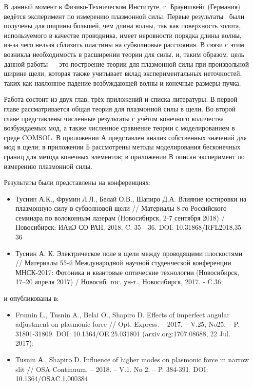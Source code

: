 В данный момент в Физико-Техническом Институте, г. Брауншвейг (Германия) ведётся эксперимент по измерению плазмонной силы. Первые результаты~\cite{nies2018direct} были получены для ширины большей, чем длина волны, так как поверхность золота, используемого в качестве проводника, имеет неровности порядка длины волны, из-за чего нельзя сблизить пластины на субволновые расстояния. В связи с этим возникла необходимость в расширении теории для силы, и, таким образом, цель данной работы --- это построение теории для плазмонной силы при произвольной ширине щели, которая также учитывает вклад экспериментальных неточностей, таких как наклонное падение возбуждающей волны и конечные размеры пучка. 

Работа состоит из двух глав, трёх приложений и списка литературы.
В первой главе рассматривается общая теория для плазмонной силы в щели. Во второй главе представлены численные результаты с учётом конечного количества возбуждаемых мод, а также численное сравнение теории с моделированием в среде COMSOL. В приложении А представлен анализ собственных значений для мод в щели; в приложении Б рассмотрены методы моделирования бесконечных границ для метода конечных элементов; в приложении В описан эксперимент по измерению плазмонной силы.

Результаты были представлены на конференциях:
\begin{itemize} 
    \item Туснин А.К., Фрумин Л.Л., Белай О.В., Шапиро Д.А. Влияние
юстировки на плазмонную силу в субволновой щели // Материалы 8-го Российского семинара по волоконным лазерам (Новосибирск, 2-7 сентября 2018) / Новосибирск: ИАиЭ СО РАН, 2018,
C. 35—36. DOI: 10.31868/RFL2018.35-36
    \item Туснин А. К. Электрическое поле в щели между проводящими
плоскостями // Материалы 55-й Международной научной студенческой конференции МНСК-2017: Фотоника и квантовые оптические технологии (Новосибирск, 17–20 апреля 2017) / Новосиб. гос.
ун-т., Новосибирск, 2017. - C.36;
\end{itemize}
и опубликованы в:
\begin{itemize} 
    \item Frumin L., Tusnin A., Belai O., Shapiro D. Effects of imperfect
    angular adjustment on plasmonic force // Opt. Express. –
    2017. – V.25, No25. – P. 31801-31809. DOI: 10.1364/OE.25.031801
    (arxiv.org:1707.08688, 22 Jul. 2017);
    \item Tusnin А., Shapiro D. Influence of higher modes on plasmonic force
in narrow slit // OSA Continuum. – 2018. – V.1, No 2. – P. 384-391.
DOI: 10.1364/OSAC.1.000384
\end{itemize}

